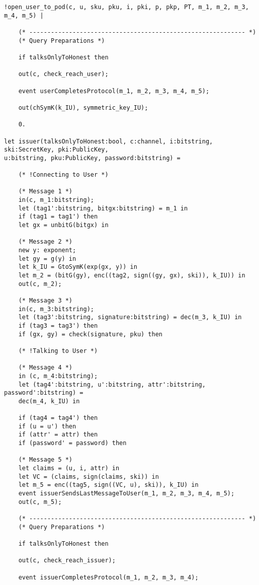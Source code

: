 \begin{Verbatim}[fontsize=\small]
    !open_user_to_pod(c, u, sku, pku, i, pki, p, pkp, PT, m_1, m_2, m_3, m_4, m_5) |

    (* ------------------------------------------------------------ *)
    (* Query Preparations *)

    if talksOnlyToHonest then

    out(c, check_reach_user);

    event userCompletesProtocol(m_1, m_2, m_3, m_4, m_5);

    out(chSymK(k_IU), symmetric_key_IU);

    0.

let issuer(talksOnlyToHonest:bool, c:channel, i:bitstring, ski:SecretKey, pki:PublicKey,
u:bitstring, pku:PublicKey, password:bitstring) =

    (* !Connecting to User *)

    (* Message 1 *)
    in(c, m_1:bitstring);
    let (tag1':bitstring, bitgx:bitstring) = m_1 in
    if (tag1 = tag1') then
    let gx = unbitG(bitgx) in

    (* Message 2 *)
    new y: exponent;
    let gy = g(y) in
    let k_IU = GtoSymK(exp(gx, y)) in
    let m_2 = (bitG(gy), enc((tag2, sign((gy, gx), ski)), k_IU)) in
    out(c, m_2);

    (* Message 3 *)
    in(c, m_3:bitstring);
    let (tag3':bitstring, signature:bitstring) = dec(m_3, k_IU) in
    if (tag3 = tag3') then
    if (gx, gy) = check(signature, pku) then

    (* !Talking to User *)

    (* Message 4 *)
    in (c, m_4:bitstring);
    let (tag4':bitstring, u':bitstring, attr':bitstring, password':bitstring) = 
    dec(m_4, k_IU) in

    if (tag4 = tag4') then
    if (u = u') then
    if (attr' = attr) then
    if (password' = password) then

    (* Message 5 *)
    let claims = (u, i, attr) in
    let VC = (claims, sign(claims, ski)) in
    let m_5 = enc((tag5, sign((VC, u), ski)), k_IU) in
    event issuerSendsLastMessageToUser(m_1, m_2, m_3, m_4, m_5);
    out(c, m_5);

    (* ------------------------------------------------------------ *)
    (* Query Preparations *)

    if talksOnlyToHonest then

    out(c, check_reach_issuer);

    event issuerCompletesProtocol(m_1, m_2, m_3, m_4);


\end{Verbatim}
